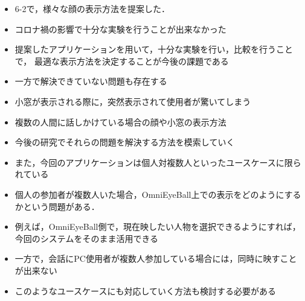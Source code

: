 \begin{itemize}
  \item 6-2で，様々な顔の表示方法を提案した．
  \item コロナ禍の影響で十分な実験を行うことが出来なかった
  \item 提案したアプリケーションを用いて，十分な実験を行い，比較を行うことで，
  最適な表示方法を決定することが今後の課題である
  \item 一方で解決できていない問題も存在する
  \item 小窓が表示される際に，突然表示されて使用者が驚いてしまう
  \item 複数の人間に話しかけている場合の顔や小窓の表示方法
  \item 今後の研究でそれらの問題を解決する方法を模索していく
  \item また，今回のアプリケーションは個人対複数人といったユースケースに限られている
  \item 個人の参加者が複数人いた場合，OmniEyeBall上での表示をどのようにするかという問題がある．
  \item 例えば，OmniEyeBall側で，現在映したい人物を選択できるようにすれば，今回のシステムをそのまま活用できる
  \item 一方で，会話にPC使用者が複数人参加している場合には，同時に映すことが出来ない
  \item このようなユースケースにも対応していく方法も検討する必要がある
\end{itemize}